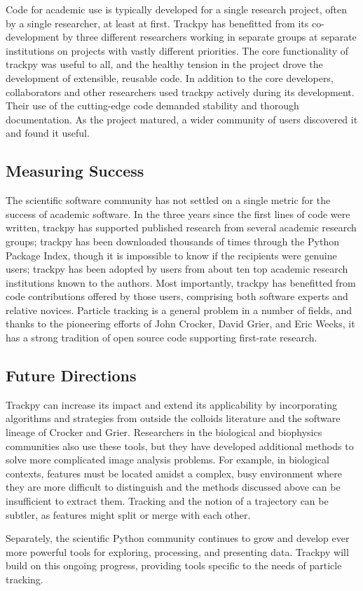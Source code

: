 Code for academic use is typically developed for a single research project, often by a single researcher, at least at first. Trackpy has benefitted from its co-development by three different researchers working in separate groups at separate institutions on projects with vastly different priorities. The core functionality of trackpy was useful to all, and the healthy tension in the project drove the development of extensible, reusable code. In addition to the core developers, collaborators and other researchers used trackpy actively during its development. Their use of the cutting-edge code demanded stability and thorough documentation. As the project matured, a wider community of users discovered it and found it useful.

\subsection{Measuring Success}
The scientific software community has not settled on a single metric for the success of academic software. In the three years since the first lines of code were written, trackpy has supported published research from several academic research groups; trackpy has been downloaded thousands of times through the Python Package Index, though it is impossible to know if the recipients were genuine users; trackpy has been adopted by users from about ten top academic research institutions known to the authors. Most importantly, trackpy has benefitted from code contributions offered by those users, comprising both software experts and relative novices. Particle tracking is a general problem in a number of fields, and thanks to the pioneering efforts of John Crocker, David Grier, and Eric Weeks, it has a strong tradition of open source code supporting first-rate research.

\subsection{Future Directions}

Trackpy can increase its impact and extend its applicability by incorporating algorithms and strategies from outside the colloids literature and the software lineage of Crocker and Grier. Researchers in the biological and biophysics communities also use these tools, but they have developed additional methods to solve more complicated image analysis problems. For example, in biological contexts, features must be located amidst a complex, busy environment where they are more difficult to distinguish and the methods discussed above can be insufficient to extract them. Tracking and the notion of a trajectory can be subtler, as features might split or merge with each other.

Separately, the scientific Python community continues to grow and develop ever more powerful tools for exploring, processing, and presenting data. Trackpy will build on this ongoing progress, providing tools specific to the needs of particle tracking.